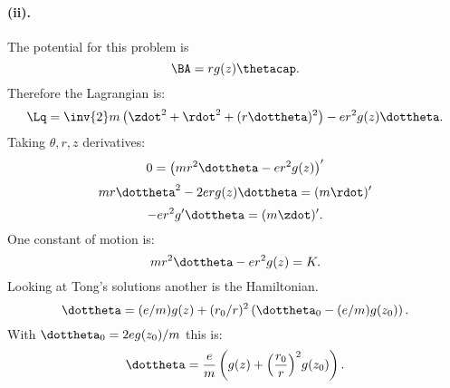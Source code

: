 {\paragraph{(ii).}
%
The potential for this problem is
%
\begin{equation}\label{eqn:tongMf1:2000}
\BA =  r g(z) \thetacap.
\end{equation}
%
Therefore the Lagrangian is:
\begin{equation}\label{eqn:tongMf1:2020}
\Lq = \inv{2} m \left(\zdot^2 + \rdot^2 + (r\dottheta)^2\right) - e r^2 g(z) \dottheta.
\end{equation}
%
Taking \(\theta, r, z\) derivatives:
\begin{equation}\label{eqn:tongMf1:2040}
0 = \left(mr^2 \dottheta - e r^2 g(z)\right)'
\end{equation}
\begin{equation}\label{eqn:tongMf1:2060}
mr \dottheta^2 - 2 e r g(z) \dottheta = (m \rdot)'
\end{equation}
\begin{equation}\label{eqn:tongMf1:2080}
-e r^2 g' \dottheta = ( m \zdot )'.
\end{equation}
%
One constant of motion is:
%
\begin{equation}\label{eqn:tongMf1:2100}
mr^2 \dottheta - e r^2 g(z) = K.
\end{equation}
%
Looking at Tong's solutions another is the Hamiltonian.
%
\begin{equation}\label{eqn:tongMf1:2120}
\dottheta = (e/m) g(z) + (r_0/r)^2 \left(\dottheta_0 - (e/m) g(z_0)\right).
\end{equation}
%
With \(\dottheta_0 = 2 e g(z_0)/m\) this is:
%
\begin{equation}\label{eqn:tongMf1:2140}
\dottheta = \frac{e}{m} \left(g(z) + {\left(\frac{r_0}{r}\right)}^2 g(z_0)\right).
\end{equation}
%
}
%
